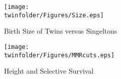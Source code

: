 \setcounter{figure}{0}
\renewcommand{\thefigure}{A\arabic{figure}}

\begin{figure}[htpb!]
\begin{center}
\caption{Birth Size of Twins versus Singeltons}
\label{TWINfig:Size}
\texttt{[image: \\twinfolder/Figures/Size.eps]} 
\end{center}
\end{figure}

\begin{figure}[htpb!]
\begin{center}
\caption{Height and Selective Survival}
\label{TWINfig:survival}
\texttt{[image: \\twinfolder/Figures/MMRcuts.eps]} 
\end{center}
\end{figure}


